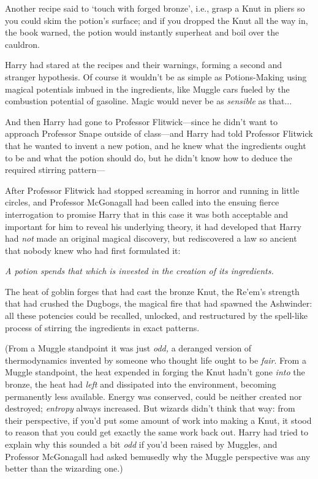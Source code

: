Another recipe said to ‘touch with forged bronze’, i.e., grasp a
Knut in pliers so you could skim the potion’s surface; and if you
dropped the Knut all the way in, the book warned, the potion would
instantly superheat and boil over the cauldron.

Harry had stared at the recipes and their warnings, forming a
second and stranger hypothesis. Of course it wouldn’t be as simple
as Potions-Making using magical potentials imbued in the
ingredients, like Muggle cars fueled by the combustion potential of
gasoline. Magic would never be as \emph{sensible} as that...

And then Harry had gone to Professor Flitwick—since he didn’t
want to approach Professor Snape outside of class—and Harry had
told Professor Flitwick that he wanted to invent a new potion, and
he knew what the ingredients ought to be and what the potion should
do, but he didn’t know how to deduce the required stirring pattern—

After Professor Flitwick had stopped screaming in horror and
running in little circles, and Professor McGonagall had been called
into the ensuing fierce interrogation to promise Harry that in this
case it was both acceptable and important for him to reveal his
underlying theory, it had developed that Harry had \emph{not} made
an original magical discovery, but rediscovered a law so ancient
that nobody knew who had first formulated it:

\emph{A potion spends that which is invested in the creation of its
ingredients.}

The heat of goblin forges that had cast the bronze Knut, the
Re’em’s strength that had crushed the Dugbogs, the magical fire
that had spawned the Ashwinder: all these potencies could be
recalled, unlocked, and restructured by the spell-like process of
stirring the ingredients in exact patterns.

(From a Muggle standpoint it was just \emph{odd,} a deranged
version of thermodynamics invented by someone who thought life
ought to be \emph{fair}. From a Muggle standpoint, the heat
expended in forging the Knut hadn’t gone \emph{into} the bronze,
the heat had \emph{left} and dissipated into the environment,
becoming permanently less available. Energy was conserved, could be
neither created nor destroyed; \emph{entropy} always increased. But
wizards didn’t think that way: from their perspective, if you’d put
some amount of work into making a Knut, it stood to reason that you
could get exactly the same work back out. Harry had tried to
explain why this sounded a bit \emph{odd} if you’d been raised by
Muggles, and Professor McGonagall had asked bemusedly why the
Muggle perspective was any better than the wizarding one.)

